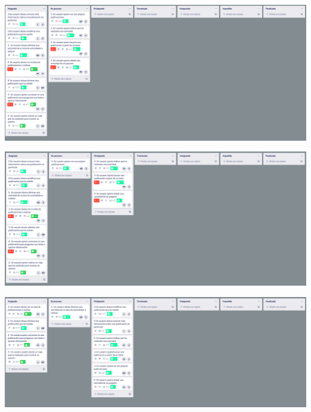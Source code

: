 \documentclass[spanish]{beamer}
\begin{document}
\begin{frame}
	\begin{center}
		\includegraphics[scale=0.25]{trello2_2}
	\end{center}
\end{frame}

\begin{frame}
	\begin{center}
	\end{center}
\end{frame}

\begin{frame}
	\begin{center}
		\includegraphics[scale=0.24]{trello2_3}
	\end{center}
\end{frame}

\begin{frame}
	\begin{center}
	\end{center}
\end{frame}

\begin{frame}
	\begin{center}
		\includegraphics[scale=0.24]{trello2_4}
	\end{center}
\end{frame}
\end{document}
